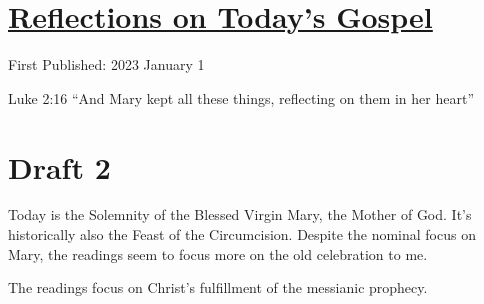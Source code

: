 \documentclass[12pt]{article}[titlepage]
\newcommand{\say}[1]{``#1''}
\newcommand{\1}{\={a}}
\newcommand{\2}{\={e}}
\newcommand{\3}{\={\i}}
\newcommand{\4}{\=o}
\newcommand{\5}{\=u}
\newcommand{\6}{\={A}}
\renewcommand{\,}{\textsuperscript{,}}
\begin{document}
\doublespacing
\section{\href{reflections-on-readings-mary-mother-23.html}{Reflections on Today's Gospel}}
First Published: 2023 January 1

Luke 2:16  \say{And Mary kept all these things, reflecting on them in her heart}
\section{Draft 2}
Today is the Solemnity of the Blessed Virgin Mary, the Mother of God.
It's historically also the Feast of the Circumcision.
Despite the nominal focus on Mary, the readings seem to focus more on the old celebration to me.

The readings focus on Christ's fulfillment of the messianic prophecy.
\end{document}
